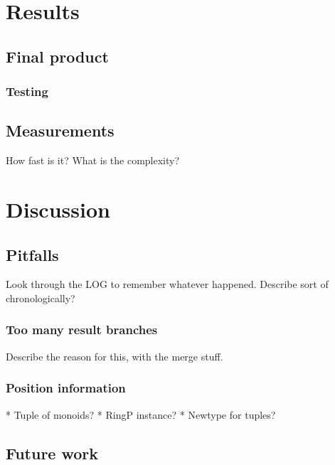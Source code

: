 \documentclass[a4paper,12pt,twosided]{report}
\begin{document}
%
%

\chapter{Results}

\section{Final product}
\subsection{Testing}

\section{Measurements}
How fast is it? What is the complexity?

%
%
\chapter{Discussion}

\section{Pitfalls}
Look through the LOG to remember whatever happened. Describe sort of chronologically?

\subsection{Too many result branches}
Describe the reason for this, with the merge stuff.

\subsection{Position information}
* Tuple of monoids?
* RingP instance?
* Newtype for tuples?

\section{Future work}

%
%



%
%
\end{document}
